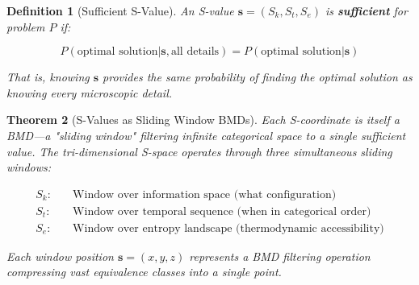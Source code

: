 \documentclass[12pt,a4paper]{article}
\newtheorem{theorem}{Theorem}[section]
\newtheorem{definition}[theorem]{Definition}
\begin{document}
\begin{definition}[Sufficient S-Value]
\label{def:sufficient_s}
An S-value $\mathbf{s} = (S_k, S_t, S_e)$ is \textbf{sufficient} for problem $P$ if:

\begin{equation}
P(\text{optimal solution} | \mathbf{s}, \text{all details}) = P(\text{optimal solution} | \mathbf{s})
\end{equation}

That is, knowing $\mathbf{s}$ provides the same probability of finding the optimal solution as knowing every microscopic detail.
\end{definition}

\begin{theorem}[S-Values as Sliding Window BMDs]
\label{thm:sliding_windows}
Each S-coordinate is itself a BMD—a "sliding window" filtering infinite categorical space to a single sufficient value. The tri-dimensional S-space operates through three simultaneous sliding windows:

\begin{align}
S_k: \quad &\text{Window over information space (what configuration)} \\
S_t: \quad &\text{Window over temporal sequence (when in categorical order)} \\
S_e: \quad &\text{Window over entropy landscape (thermodynamic accessibility)}
\end{align}

Each window position $\mathbf{s} = (x, y, z)$ represents a BMD filtering operation compressing vast equivalence classes into a single point.
\end{theorem}
\end{document}
